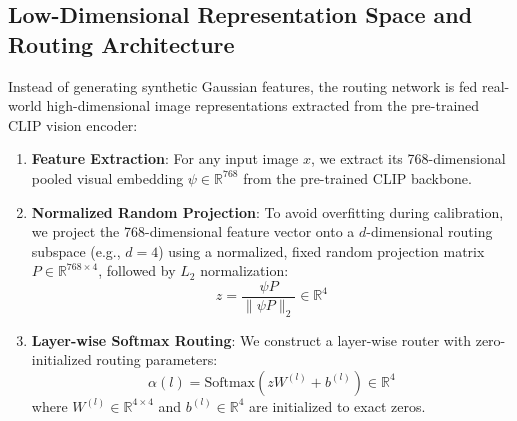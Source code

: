 \documentclass{article}
\theoremstyle{plain}
\theoremstyle{definition}
\theoremstyle{remark}
\begin{document}
\subsection{Low-Dimensional Representation Space and Routing Architecture}
Instead of generating synthetic Gaussian features, the routing network is fed real-world high-dimensional image representations extracted from the pre-trained CLIP vision encoder:
\begin{enumerate}
    \item \textbf{Feature Extraction}: For any input image $x$, we extract its 768-dimensional pooled visual embedding $\psi \in \mathbb{R}^{768}$ from the pre-trained CLIP backbone.
    \item \textbf{Normalized Random Projection}: To avoid overfitting during calibration, we project the 768-dimensional feature vector onto a $d$-dimensional routing subspace (e.g., $d=4$) using a normalized, fixed random projection matrix $P \in \mathbb{R}^{768 \times 4}$, followed by $L_2$ normalization:
    \begin{equation}
        z = \frac{\psi P}{\|\psi P\|_2} \in \mathbb{R}^4
    \end{equation}
    \item \textbf{Layer-wise Softmax Routing}: We construct a layer-wise router with zero-initialized routing parameters:
    \begin{equation}
        \alpha(l) = \text{Softmax}(z W^{(l)} + b^{(l)}) \in \mathbb{R}^4
    \end{equation}
    where $W^{(l)} \in \mathbb{R}^{4 \times 4}$ and $b^{(l)} \in \mathbb{R}^4$ are initialized to exact zeros.
\end{enumerate}
\end{document}
